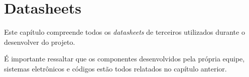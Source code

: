 

\chapter{Datasheets}
\label{chap:anexosA}

    Este capítulo compreende todos os \textit{datasheets} de terceiros utilizados durante o desenvolver do projeto.

    É importante ressaltar que os componentes desenvolvidos pela própria equipe, sistemas eletrônicos e códigos estão todos relatados no capítulo anterior.

    

    
    
     